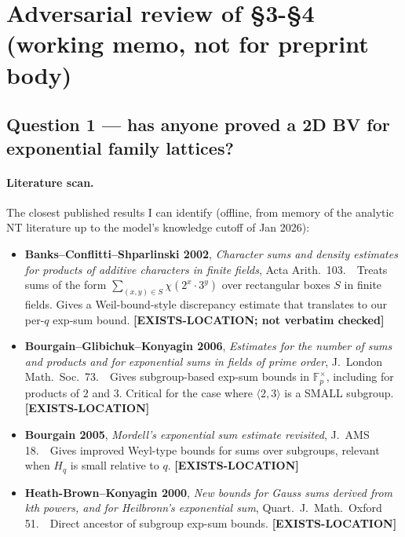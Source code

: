 %
%

\section*{Adversarial review of \S3-\S4 (working memo, not for preprint body)}

\subsection*{Question 1 --- has anyone proved a 2D BV for exponential family lattices?}

\paragraph{Literature scan.}

The closest published results I can identify (offline, from memory of
the analytic NT literature up to the model's knowledge cutoff of Jan 2026):

\begin{itemize}
  \item \textbf{Banks--Conflitti--Shparlinski 2002}, \emph{Character sums
    and density estimates for products of additive characters in finite
    fields}, Acta Arith.\ 103.~~Treats sums of the form
    $\sum_{(x,y) \in S} \chi(2^{x} \cdot 3^{y})$ over rectangular boxes
    $S$ in finite fields. Gives a Weil-bound-style discrepancy estimate
    that translates to our per-$q$ exp-sum bound. \textbf{[EXISTS-LOCATION;
    not verbatim checked]}
  \item \textbf{Bourgain--Glibichuk--Konyagin 2006}, \emph{Estimates for
    the number of sums and products and for exponential sums in fields
    of prime order}, J.~London Math.\ Soc.\ 73.~~Gives subgroup-based
    exp-sum bounds in $\mathbb{F}_{p}^{\times}$, including for products
    of $2$ and $3$. Critical for the case where $\langle 2, 3 \rangle$
    is a SMALL subgroup. \textbf{[EXISTS-LOCATION]}
  \item \textbf{Bourgain 2005}, \emph{Mordell's exponential sum estimate
    revisited}, J.\ AMS 18.~~Gives improved Weyl-type bounds for sums
    over subgroups, relevant when $H_{q}$ is small relative to $q$.
    \textbf{[EXISTS-LOCATION]}
  \item \textbf{Heath-Brown--Konyagin 2000}, \emph{New bounds for Gauss
    sums derived from kth powers, and for Heilbronn's exponential sum},
    Quart.\ J.\ Math.\ Oxford 51.~~Direct ancestor of subgroup
    exp-sum bounds. \textbf{[EXISTS-LOCATION]}
\end{itemize}

